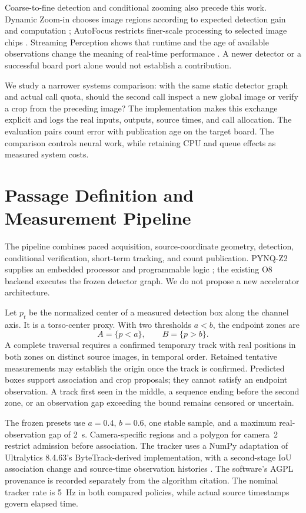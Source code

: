 \documentclass[journal]{IEEEtran}
\begin{document}
Coarse-to-fine detection and conditional zooming also precede this work. Dynamic Zoom-in chooses image regions according to expected detection gain and computation \cite{dynamic_zoom_2018}; AutoFocus restricts finer-scale processing to selected image chips \cite{autofocus_2019}. Streaming Perception shows that runtime and the age of available observations change the meaning of real-time performance \cite{streaming_2020}. A newer detector or a successful board port alone would not establish a contribution.

We study a narrower systems comparison: with the same static detector graph and actual call quota, should the second call inspect a new global image or verify a crop from the preceding image? The implementation makes this exchange explicit and logs the real inputs, outputs, source times, and call allocation. The evaluation pairs count error with publication age on the target board. The comparison controls neural work, while retaining CPU and queue effects as measured system costs.

\section{Passage Definition and Measurement Pipeline}
The pipeline combines paced acquisition, source-coordinate geometry, detection, conditional verification, short-term tracking, and count publication. PYNQ-Z2 supplies an embedded processor and programmable logic \cite{pynqz2}; the existing O8 backend executes the frozen detector graph. We do not propose a new accelerator architecture.

Let $p_t$ be the normalized center of a measured detection box along the channel axis. It is a torso-center proxy. With two thresholds $a<b$, the endpoint zones are
\begin{equation}
 A=\{p<a\},\qquad B=\{p>b\}.
\end{equation}
A complete traversal requires a confirmed temporary track with real positions in both zones on distinct source images, in temporal order. Retained tentative measurements may establish the origin once the track is confirmed. Predicted boxes support association and crop proposals; they cannot satisfy an endpoint observation. A track first seen in the middle, a sequence ending before the second zone, or an observation gap exceeding the bound remains censored or uncertain.

The frozen presets use $a=0.4$, $b=0.6$, one stable sample, and a maximum real-observation gap of 2~s. Camera-specific regions and a polygon for camera~2 restrict admission before association. The tracker uses a NumPy adaptation of Ultralytics 8.4.63's ByteTrack-derived implementation, with a second-stage IoU association change and source-time observation histories \cite{bytetrack}. The software's AGPL provenance is recorded separately from the algorithm citation. The nominal tracker rate is 5~Hz in both compared policies, while actual source timestamps govern elapsed time.
\end{document}
